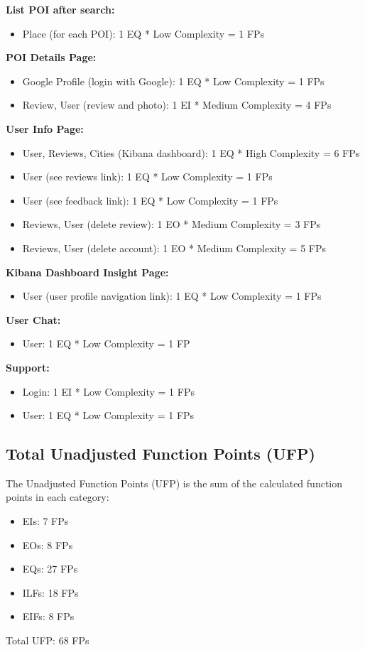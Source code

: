 \documentclass[../main.tex]{subfiles}
\begin{document}
\textbf{List POI after search:}
\begin{itemize}
  \item Place (for each POI): 1 EQ * Low Complexity = 1 FPs
\end{itemize}

\textbf{POI Details Page:}
\begin{itemize}
  \item Google Profile (login with Google): 1 EQ * Low Complexity = 1 FPs
  \item Review, User (review and photo): 1 EI * Medium Complexity = 4 FPs
\end{itemize}

\textbf{User Info Page:}
\begin{itemize}
  \item User, Reviews, Cities (Kibana dashboard): 1 EQ * High Complexity = 6 FPs
  \item User (see reviews link): 1 EQ * Low Complexity = 1 FPs
  \item User (see feedback link): 1 EQ * Low Complexity = 1 FPs
  \item Reviews, User (delete review): 1 EO * Medium Complexity = 3 FPs
  \item Reviews, User (delete account): 1 EO * Medium Complexity = 5 FPs
\end{itemize}

\textbf{Kibana Dashboard Insight Page:}
\begin{itemize}
  \item User (user profile navigation link): 1 EQ * Low Complexity = 1 FPs
\end{itemize}

\textbf{User Chat:}
\begin{itemize}
  \item User: 1 EQ * Low Complexity = 1 FP
\end{itemize}

\textbf{Support:}
\begin{itemize}
  \item Login: 1 EI * Low Complexity = 1 FPs 
  \item User: 1 EQ * Low Complexity = 1 FPs
\end{itemize}

\subsection{Total Unadjusted Function Points (UFP)}

The Unadjusted Function Points (UFP) is the sum of the calculated function points in each category:

\begin{itemize}
  \item EIs: 7 FPs
  \item EOs: 8 FPs
  \item EQs: 27 FPs
  \item ILFs: 18 FPs
  \item EIFs: 8 FPs
\end{itemize}

Total UFP: 68 FPs
\end{document}

